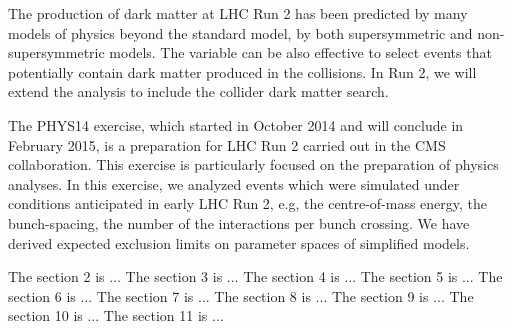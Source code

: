 The production of dark matter at LHC Run 2 has been predicted by many
models of physics beyond the standard model, by both supersymmetric and
non-supersymmetric models. The variable \alphat can be also effective to
select events that potentially contain dark matter produced in the
collisions. In Run 2, we will extend the \alphat analysis to include the
collider dark matter search.

The PHYS14 exercise, which started in October 2014 and will conclude in
February 2015, is a preparation for LHC Run 2 carried out in the CMS
collaboration. This exercise is particularly focused on the preparation
of physics analyses. In this exercise, we analyzed events which were
simulated under conditions anticipated in early LHC Run 2, e.g, the
centre-of-mass energy, the bunch-spacing, the number of the interactions
per bunch crossing. We have derived expected exclusion limits on
parameter spaces of simplified models.

The section 2 is ...
The section 3 is ...
The section 4 is ...
The section 5 is ...
The section 6 is ...
The section 7 is ...
The section 8 is ...
The section 9 is ...
The section 10 is ...
The section 11 is ...



